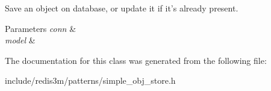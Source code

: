 Save an object on database, or update it if it's already present. 


\begin{DoxyParams}{Parameters}
{\em conn} & \\
\hline
{\em model} & \\
\hline
\end{DoxyParams}


The documentation for this class was generated from the following file\-:\begin{DoxyCompactItemize}
\item 
include/redis3m/patterns/simple\-\_\-obj\-\_\-store.\-h\end{DoxyCompactItemize}
